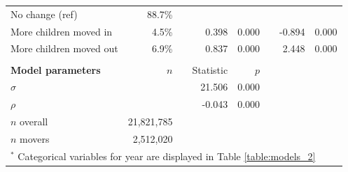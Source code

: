 \begin{table}[H]
\begin{adjustwidth}{-1in}{-1in}
\begin{tabular}{lrrrrrrr}
		\hspace{2mm} No change (ref)                   & 88.7\%  &  &                          &                       &                      &                          &                       \\
		\hspace{2mm} More children moved in                         & 4.5\%   &  & 0.398                    & 0.000                 &                      & -0.894                   & 0.000                 \\
		\hspace{2mm} More children moved out                        & 6.9\%   &  & 0.837                    & 0.000                 &                      & 2.448                    & 0.000                 \\ \hline
		&         &  &                          &                       &                      &                          &                       \\
		\textbf{Model parameters}                  &   $n$   &    & Statistic & $p$                          &                                            &                          &                       \\ \hline
		$\sigma$                                     &         &  & 21.506                   & 0.000                 &                      &                          &                       \\
		$\rho$                                       &         &  & -0.043                   & 0.000                 &                      &                          &                       \\
		$n$ overall                             &           21,821,785  &  &              &                       &                      &                          &                       \\
		$n$ movers                               &            2,512,020 &  &               &                       &                      &                          &       \\ \hline          
		\multicolumn{8}{p{12.2cm}}{\small{$^*$ Categorical variables for year are displayed in Table \ref{table:models_2}}}\\
		
	\end{tabular}
	\end{adjustwidth}
	
\end{table}




